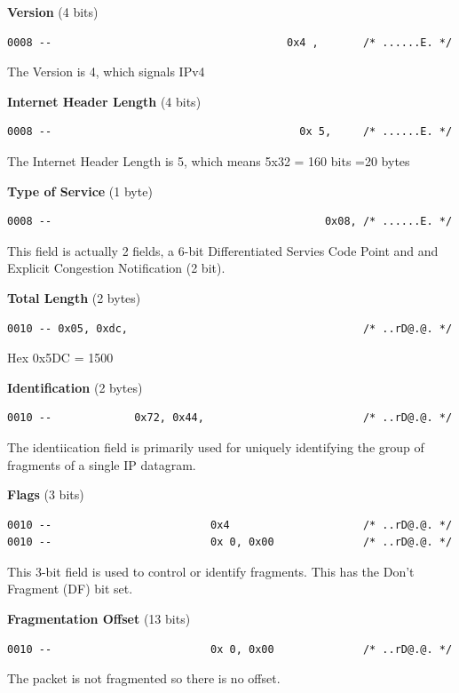 \vspace{1mm}
\noindent
{\bf Version} (4 bits)
\begin{verbatim}
0008 --                                     0x4 ,       /* ......E. */
\end{verbatim}
The Version is 4, which signals IPv4

\vspace{1mm}
\noindent
{\bf Internet Header Length} (4 bits)
\begin{verbatim}
0008 --                                       0x 5,     /* ......E. */
\end{verbatim}
The Internet Header Length is 5, which means 5x32 = 160 bits =20 bytes

\vspace{1mm}
\noindent
{\bf Type of Service} (1 byte)
\begin{verbatim}
0008 --                                           0x08, /* ......E. */
\end{verbatim}
This field is actually 2 fields, a 6-bit Differentiated Servies Code Point
and and Explicit Congestion Notification (2 bit). \cite{41}

\vspace{1mm}
\noindent
{\bf Total Length} (2 bytes)
\begin{verbatim}
0010 -- 0x05, 0xdc,                                     /* ..rD@.@. */
\end{verbatim}
Hex 0x5DC = 1500

\vspace{1mm}
\noindent
{\bf Identification} (2 bytes)
\begin{verbatim}
0010 --             0x72, 0x44,                         /* ..rD@.@. */
\end{verbatim}
The identiication field is primarily used for uniquely identifying the
group of fragments of a single IP datagram. \cite{41}

\vspace{1mm}
\noindent
{\bf Flags} (3 bits)
\begin{verbatim}
0010 --                         0x4                     /* ..rD@.@. */
0010 --                         0x 0, 0x00              /* ..rD@.@. */
\end{verbatim}
This 3-bit field is used to control or identify fragments.
This has the Don't Fragment (DF) bit set.\cite{41}

\vspace{1mm}
\noindent
{\bf Fragmentation Offset} (13 bits)
\begin{verbatim}
0010 --                         0x 0, 0x00              /* ..rD@.@. */
\end{verbatim}
The packet is not fragmented so there is no offset.

